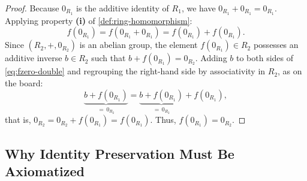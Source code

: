 \begin{content}

\begin{proof}
Because $0_{R_1}$ is the additive identity of $R_1$, we have $0_{R_1} + 0_{R_1} = 0_{R_1}$. Applying property \textbf{(i)} of \cref{def:ring-homomorphism}:
\begin{equation}\label{eq:fzero-double}
f(0_{R_1}) = f(0_{R_1} + 0_{R_1}) = f(0_{R_1}) + f(0_{R_1}).
\end{equation}
Since $(R_2, +, 0_{R_2})$ is an abelian group, the element $f(0_{R_1}) \in R_2$ possesses an additive inverse $b \in R_2$ such that $b + f(0_{R_1}) = 0_{R_2}$. Adding $b$ to both sides of \eqref{eq:fzero-double} and regrouping the right-hand side by associativity in $R_2$, as on the board:
\[
\underbrace{b + f(0_{R_1})}_{=\,0_{R_2}} = \underbrace{b + f(0_{R_1})}_{=\,0_{R_2}} + f(0_{R_1}),
\]
that is, $0_{R_2} = 0_{R_2} + f(0_{R_1}) = f(0_{R_1})$. Thus, $f(0_{R_1}) = 0_{R_2}$.
\end{proof}
\end{content}

\subsection{Why Identity Preservation Must Be Axiomatized}

